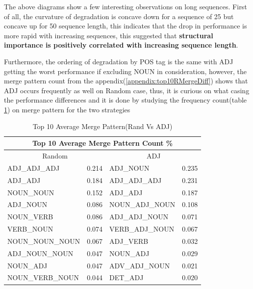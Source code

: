 \documentclass[12pt]{article}
\begin{document}
The above diagrams show a few interesting observations on long sequences. First of all, the curvature of degradation is concave down for a sequence of 25 but concave up for 50 sequence length, this indicates that the drop in performance is more rapid with increasing sequences, this suggested that \textbf{structural importance is positively correlated with increasing sequence length}. 

Furthermore, the ordering of degradation by POS tag is the same with ADJ getting the worst performance if excluding NOUN in consideration, however, the merge pattern count from the appendix(\ref{appendix:top10RMergeDiff}) shows that ADJ occurs frequently as well on Random case, thus, it is curious on what casing the performance differences and it is done by studying the frequency count(table \ref{tab:top10AvgMegePatternRandADJ}) on merge pattern for the two strategies
\begin{table}[!h]
\fontsize{10pt}{10pt}\selectfont
\begin{center}
\begin{tabular}{|llll|}
\hline
\multicolumn{4}{|c|}{Top 10 Average Merge Pattern Count \%}                                                        \\ \hline
\multicolumn{2}{|c|}{Random}                                        & \multicolumn{2}{c|}{ADJ}                     \\ \hline
\multicolumn{1}{|l|}{ADJ\_ADJ\_ADJ}    & \multicolumn{1}{l|}{0.214} & \multicolumn{1}{l|}{ADJ\_NOUN}       & 0.235 \\ \hline
\multicolumn{1}{|l|}{ADJ\_ADJ}         & \multicolumn{1}{l|}{0.184} & \multicolumn{1}{l|}{ADJ\_ADJ\_ADJ}   & 0.231 \\ \hline
\multicolumn{1}{|l|}{NOUN\_NOUN}       & \multicolumn{1}{l|}{0.152} & \multicolumn{1}{l|}{ADJ\_ADJ}        & 0.187 \\ \hline
\multicolumn{1}{|l|}{ADJ\_NOUN}        & \multicolumn{1}{l|}{0.086} & \multicolumn{1}{l|}{NOUN\_ADJ\_NOUN} & 0.108 \\ \hline
\multicolumn{1}{|l|}{NOUN\_VERB}       & \multicolumn{1}{l|}{0.086} & \multicolumn{1}{l|}{ADJ\_ADJ\_NOUN}  & 0.071 \\ \hline
\multicolumn{1}{|l|}{VERB\_NOUN}       & \multicolumn{1}{l|}{0.074} & \multicolumn{1}{l|}{VERB\_ADJ\_NOUN} & 0.067 \\ \hline
\multicolumn{1}{|l|}{NOUN\_NOUN\_NOUN} & \multicolumn{1}{l|}{0.067} & \multicolumn{1}{l|}{ADJ\_VERB}       & 0.032 \\ \hline
\multicolumn{1}{|l|}{ADJ\_NOUN\_NOUN}  & \multicolumn{1}{l|}{0.047} & \multicolumn{1}{l|}{NOUN\_ADJ}       & 0.029 \\ \hline
\multicolumn{1}{|l|}{NOUN\_ADJ}        & \multicolumn{1}{l|}{0.047} & \multicolumn{1}{l|}{ADV\_ADJ\_NOUN}  & 0.021 \\ \hline
\multicolumn{1}{|l|}{NOUN\_VERB\_NOUN} & \multicolumn{1}{l|}{0.044} & \multicolumn{1}{l|}{DET\_ADJ}        & 0.020 \\ \hline
\end{tabular}
\caption{Top 10 Average Merge Pattern(Rand Vs ADJ)}
\label{tab:top10AvgMegePatternRandADJ}
\end{center}
\end{table}
\end{document}
